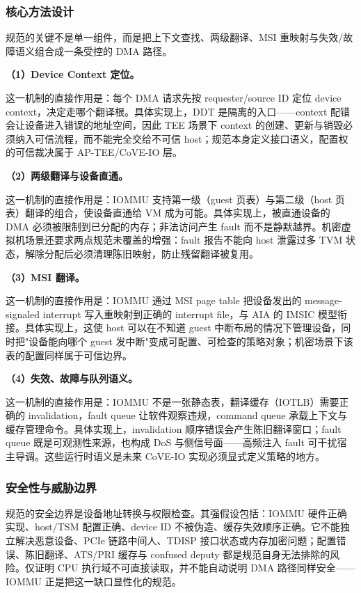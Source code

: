 \documentclass[11pt]{ctexart}
\begin{document}
\subsubsection{核心方法设计}
规范的关键不是单一组件，而是把上下文查找、两级翻译、MSI 重映射与失效/故障语义组合成一条受控的 DMA 路径。\par
\noindent\textbf{（1）Device Context 定位。}\par
这一机制的直接作用是：每个 DMA 请求先按 requester/source ID 定位 device context，决定走哪个翻译根。具体实现上，DDT 是隔离的入口——context 配错会让设备进入错误的地址空间，因此 TEE 场景下 context 的创建、更新与销毁必须纳入可信流程，而不能完全交给不可信 host；规范本身定义接口语义，配置权的可信裁决属于 AP-TEE/CoVE-IO 层。\par
\noindent\textbf{（2）两级翻译与设备直通。}\par
这一机制的直接作用是：IOMMU 支持第一级（guest 页表）与第二级（host 页表）翻译的组合，使设备直通给 VM 成为可能。具体实现上，被直通设备的 DMA 必须被限制到已分配的内存；非法访问产生 fault 而不是静默越界。机密虚拟机场景还要求两点规范未覆盖的增强：fault 报告不能向 host 泄露过多 TVM 状态，解除分配后必须清理陈旧映射，防止残留翻译被复用。\par
\noindent\textbf{（3）MSI 翻译。}\par
这一机制的直接作用是：IOMMU 通过 MSI page table 把设备发出的 message-signaled interrupt 写入重映射到正确的 interrupt file，与 AIA 的 IMSIC 模型衔接。具体实现上，这使 host 可以在不知道 guest 中断布局的情况下管理设备，同时把"设备能向哪个 guest 发中断"变成可配置、可检查的策略对象；机密场景下该表的配置同样属于可信边界。\par
\noindent\textbf{（4）失效、故障与队列语义。}\par
这一机制的直接作用是：IOMMU 不是一张静态表，翻译缓存（IOTLB）需要正确的 invalidation，fault queue 让软件观察违规，command queue 承载上下文与缓存管理命令。具体实现上，invalidation 顺序错误会产生陈旧翻译窗口；fault queue 既是可观测性来源，也构成 DoS 与侧信号面——高频注入 fault 可干扰宿主导调。这些运行时语义是未来 CoVE-IO 实现必须显式定义策略的地方。\par
\subsubsection{安全性与威胁边界}
规范的安全边界是设备地址转换与权限检查。其强假设包括：IOMMU 硬件正确实现、host/TSM 配置正确、device ID 不被伪造、缓存失效顺序正确。它不能独立解决恶意设备、PCIe 链路中间人、TDISP 接口状态或内存加密问题；配置错误、陈旧翻译、ATS/PRI 缓存与 confused deputy 都是规范自身无法排除的风险。仅证明 CPU 执行域不可直接读取，并不能自动说明 DMA 路径同样安全——IOMMU 正是把这一缺口显性化的规范。\par
\end{document}
